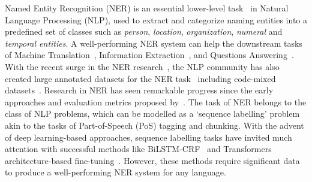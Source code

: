 \documentclass[10pt, a4paper]{article}
\begin{document}
Named Entity Recognition (NER) is an essential lower-level task~\cite{DBLP:journals/corr/MaH16} in Natural Language Processing (NLP), used to extract and categorize naming entities into a predefined set of classes such as \textit{person}, \textit{location}, \textit{organization}, \textit{numeral} and \textit{temporal entities}. A well-performing NER system can help the downstream tasks of Machine Translation~\cite{babych2003improving}, Information Extraction~\cite{neudecker2016open}, and Questions Answering~\cite{moldovan2002role}. With the recent surge in the NER research~\cite{sohrab-miwa-2018-deep,plank-2019-neural,copara-etal-2020-contextualized,grancharova-dalianis-2021-applying}, the NLP community has also created large annotated datasets for the NER task~\cite{ali-etal-2020-siner,ding2021few} including code-mixed datasets~\cite{singh-etal-2018-named}. Research in NER has seen remarkable progress since the early approaches and evaluation metrics proposed by~. The task of NER belongs to the class of NLP problems, which can be modelled as a `sequence labelling' problem akin to the tasks of Part-of-Speech (PoS) tagging and chunking. With the advent of deep learning-based approaches, sequence labelling tasks have invited much attention with successful methods like BiLSTM-CRF~\cite{DBLP:journals/corr/HuangXY15} and Transformers architecture-based fine-tuning~\cite{vaswani2017attention,wolf2019huggingface}. However, these methods require significant data to produce a well-performing NER system for any language. 

\begin{table}[!h]
\caption{Comparison of HiNER data statistics with existing Hindi NER datasets}
\label{tab:datasetStatsCompare}
\end{table}
\end{document}
